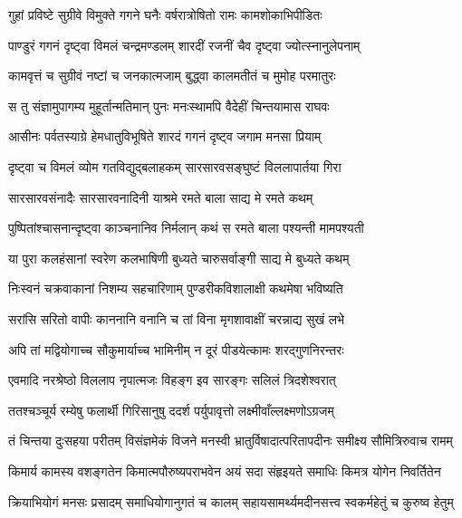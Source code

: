 \twolineshloka
{गुहां प्रविष्टे सुग्रीवे विमुक्ते गगने घनैः}
{वर्षरात्रोषितो रामः कामशोकाभिपीडितः} %

\twolineshloka
{पाण्डुरं गगनं दृष्ट्वा विमलं चन्द्रमण्डलम्}
{शारदीं रजनीं चैव दृष्ट्वा ज्योत्स्नानुलेपनाम्} %

\twolineshloka
{कामवृत्तं च सुग्रीवं नष्टां च जनकात्मजाम्}
{बुद्ध्वा कालमतीतं च मुमोह परमातुरः} %

\twolineshloka
{स तु संज्ञामुपागम्य मुहूर्तान्मतिमान् पुनः}
{मनःस्थामपि वैदेहीं चिन्तयामास राघवः} %

\twolineshloka
{आसीनः पर्वतस्याग्रे हेमधातुविभूषिते}
{शारदं गगनं दृष्ट्व जगाम मनसा प्रियाम्} %

\twolineshloka
{दृष्ट्वा च विमलं व्योम गतविद्युद्बलाहकम्}
{सारसारवसङ्घुष्टं विललापार्तया गिरा} %

\twolineshloka
{सारसारवसंनादैः सारसारवनादिनी}
{याश्रमे रमते बाला साद्य मे रमते कथम्} %

\twolineshloka
{पुष्पितांश्चासनान्दृष्ट्वा काञ्चनानिव निर्मलान्}
{कथं स रमते बाला पश्यन्ती मामपश्यती} %

\twolineshloka
{या पुरा कलहंसानां स्वरेण कलभाषिणी}
{बुध्यते चारुसर्वाङ्गी साद्य मे बुध्यते कथम्} %

\twolineshloka
{निःस्वनं चक्रवाकानां निशम्य सहचारिणाम्}
{पुण्डरीकविशालाक्षी कथमेषा भविष्यति} %

\twolineshloka
{सरांसि सरितो वापीः काननानि वनानि च}
{तां विना मृगशावाक्षीं चरन्नाद्य सुखं लभे} %

\twolineshloka
{अपि तां मद्वियोगाच्च सौकुमार्याच्च भामिनीम्}
{न दूरं पीडयेत्कामः शरद्गुणनिरन्तरः} %

\twolineshloka
{एवमादि नरश्रेष्ठो विललाप नृपात्मजः}
{विहङ्ग इव सारङ्गः सलिलं त्रिदशेश्वरात्} %

\twolineshloka
{ततश्चञ्चूर्य रम्येषु फलार्थी गिरिसानुषु}
{ददर्श पर्युपावृत्तो लक्ष्मीवाँल्लक्ष्मणोऽग्रजम्} %

\fourlineindentedshloka
{तं चिन्तया दुःसहया परीतम्}
{विसंज्ञमेकं विजने मनस्वी}
{भ्रातुर्विषादात्परितापदीनः}
{समीक्ष्य सौमित्रिरुवाच रामम्} %

\fourlineindentedshloka
{किमार्य कामस्य वशङ्गतेन}
{किमात्मपौरुष्यपराभवेन}
{अयं सदा संहृइयते समाधिः}
{किमत्र योगेन निवर्तितेन} %

\fourlineindentedshloka
{क्रियाभियोगं मनसः प्रसादम्}
{समाधियोगानुगतं च कालम्}
{सहायसामर्थ्यमदीनसत्त्व}
{स्वकर्महेतुं च कुरुष्व हेतुम्} %

